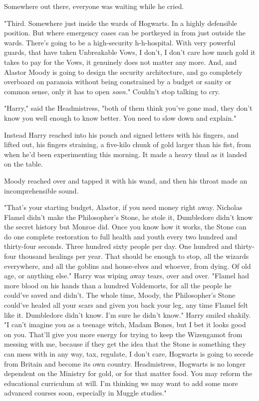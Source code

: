 Somewhere out there, everyone was waiting while he cried.

"Third. Somewhere just inside the wards of Hogwarts. In a highly defensible
position. But where emergency cases can be portkeyed in from just outside the
wards. There's going to be a high-security h-h-hospital. With very powerful
guards, that have taken Unbreakable Vows, I don't, I don't care how much gold
it takes to pay for the Vows, it genuinely does not matter any more. And, and
Alastor Moody is going to design the security architecture, and go completely
overboard on paranoia without being constrained by a budget or sanity or common
sense, only it has to open \emph{soon.}" Couldn't stop talking to cry.

"Harry," said the Headmistress, "both of them think you've gone mad, they don't
know you well enough to know better. You need to slow down and explain."

Instead Harry reached into his pouch and signed letters with his fingers, and
lifted out, his fingers straining, a five-kilo chunk of gold larger than his
fist, from when he'd been experimenting this morning. It made a heavy thud as
it landed on the table.

Moody reached over and tapped it with his wand, and then his throat made an
incomprehensible sound.

"That's your starting budget, Alastor, if you need money right away. Nicholas
Flamel didn't make the Philosopher's Stone, he stole it, Dumbledore didn't know
the secret history but Monroe did. Once you know how it works, the Stone can do
one complete restoration to full health and youth every two hundred and
thirty-four seconds. Three hundred sixty people per day. One hundred and
thirty-four thousand healings per year. That should be enough to stop, all the
wizards everywhere, and all the goblins and house-elves and whoever, from
dying. Of old age, or anything else." Harry was wiping away tears, over and
over. "Flamel had more blood on his hands than a hundred Voldemorts, for all
the people he could've saved and didn't. The whole time, Moody, the
Philosopher's Stone could've healed all your scars and given you back your leg,
any time Flamel felt like it. Dumbledore didn't know. I'm sure he didn't know."
Harry smiled shakily. "I can't imagine you as a teenage witch, Madam Bones, but
I bet it looks good on you. That'll give you more energy for trying to keep the
Wizengamot from messing with me, because if they get the idea that the Stone is
something they can mess with in any way, tax, regulate, I don't care, Hogwarts
is going to secede from Britain and become its own country. Headmistress,
Hogwarts is no longer dependent on the Ministry for gold, or for that matter
food. You may reform the educational curriculum at will. I'm thinking we may
want to add some more advanced courses soon, especially in Muggle studies."

